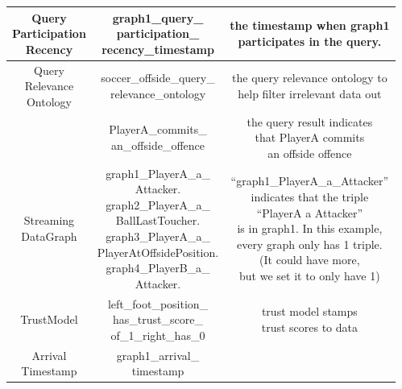 \begin{center}
\begin{longtable}{|c||c||c|}
	\makecell{Query\\Participation\\Recency} & \makecell{graph1\_query\_\\participation\_\\recency\_timestamp} & \makecell[l]{the timestamp when graph1 \\participates in the query.} \\ \hline
	\makecell{Query\\Relevance\\Ontology} & \makecell{soccer\_offside\_query\_\\relevance\_ontology} & \makecell[l]{the query relevance ontology to \\help filter irrelevant data out} \\ \hline
	\makecell{QueryResult} & \makecell{PlayerA\_commits\_\\an\_offside\_offence} & \makecell[l]{the query result indicates \\that PlayerA commits \\an offside offence} \\ \hline
	\makecell{Streaming\\DataGraph} & \makecell{graph1\_PlayerA\_a\_\\Attacker.\\graph2\_PlayerA\_a\_\\BallLastToucher.\\graph3\_PlayerA\_a\_\\PlayerAtOffsidePosition.\\graph4\_PlayerB\_a\_\\Attacker.} & \makecell[l]{``graph1\_PlayerA\_a\_Attacker'' \\indicates that the triple \\``PlayerA a Attacker''\\ is in graph1. In this example, \\every graph only has 1 triple. \\(It could have more, \\but we set it to only have 1)} \\ \hline
	TrustModel & \makecell{left\_foot\_position\_\\has\_trust\_score\_\\of\_1\_right\_has\_0} & \makecell[l]{trust model stamps \\trust scores to data} \\ \hline
	\makecell{Arrival\\Timestamp} & \makecell{graph1\_arrival\_\\timestamp} & \makecell[l]{the arrival timestamp of graph1} \\ \hline

\end{longtable}
\end{center}
